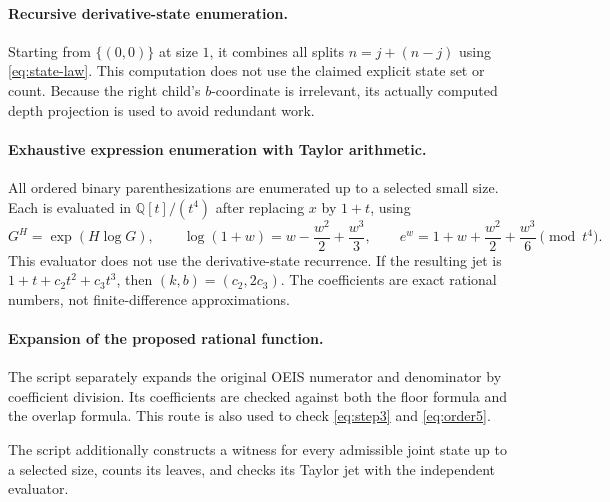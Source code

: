 \documentclass[11pt,letterpaper]{article}
\numberwithin{equation}{section}
\theoremstyle{definition}
\theoremstyle{remark}
\begin{document}
\paragraph{Recursive derivative-state enumeration.}
Starting from $\{(0,0)\}$ at size $1$, it combines all splits
$n=j+(n-j)$ using \eqref{eq:state-law}. This computation does not use
the claimed explicit state set or count. Because the right child's
$b$-coordinate is irrelevant, its actually computed depth projection
is used to avoid redundant work.

\paragraph{Exhaustive expression enumeration with Taylor arithmetic.}
All ordered binary parenthesizations are enumerated up to a selected
small size. Each is evaluated in $\mathbb Q[t]/(t^4)$ after replacing
$x$ by $1+t$, using
\[
 G^H=\exp(H\log G),\qquad
 \log(1+w)=w-\frac{w^2}{2}+\frac{w^3}{3},\qquad
 e^w=1+w+\frac{w^2}{2}+\frac{w^3}{6}
 \pmod{t^4}.
\]
This evaluator does not use the derivative-state recurrence.
If the resulting jet is
$1+t+c_2t^2+c_3t^3$, then $(k,b)=(c_2,2c_3)$.
The coefficients are exact rational numbers, not finite-difference
approximations.

\paragraph{Expansion of the proposed rational function.}
The script separately expands the original OEIS numerator and
denominator by coefficient division. Its coefficients are checked
against both the floor formula and the overlap formula. This route
is also used to check \eqref{eq:step3} and \eqref{eq:order5}.

The script additionally constructs a witness for every admissible
joint state up to a selected size, counts its leaves, and checks its
Taylor jet with the independent evaluator.
\end{document}
